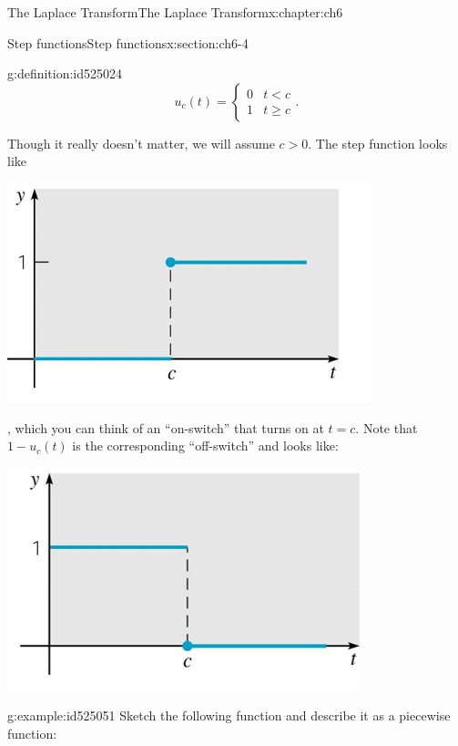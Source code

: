 \documentclass[oneside,10pt,]{book}
\numberwithin{equation}{section}
\numberwithin{equation}{section}
\newcommand{\lt}{<}
\newcommand{\amp}{&}
\begin{document}
\begin{chapterptx}{The Laplace Transform}{}{The Laplace Transform}{}{}{x:chapter:ch6}
\begin{sectionptx}{Step functions}{}{Step functions}{}{}{x:section:ch6-4}
\begin{definition}{}{g:definition:id525024}
\begin{equation*}
u_{c}(t)=\begin{cases}
0 \amp t\lt c\\
1 \amp t\geq c
\end{cases}.
\end{equation*}
%
\end{definition}
Though it really doesn't matter, we will assume \(c>0\). The step function looks like \begin{image}{0.3}{0.4}{0.3}%
\includegraphics[width=\linewidth]{images/6.3-1.jpg}
\end{image}%
, which you can think of an ``on-switch'' that turns on at \(t=c\). Note that \(1-u_{c}(t)\) is the corresponding ``off-switch'' and looks like: \begin{image}{0.3}{0.4}{0.3}%
\includegraphics[width=\linewidth]{images/6.3-2.jpg}
\end{image}%
%
\begin{example}{}{g:example:id525051}%
Sketch the following function and describe it as a piecewise function:%

\end{example}
\end{sectionptx}
\end{chapterptx}
\end{document}
